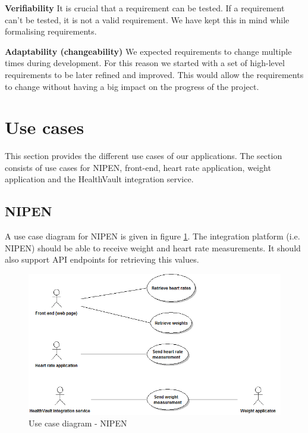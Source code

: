 \textbf{Verifiability}\newline
It is crucial that a requirement can be tested. If a requirement can't be tested, it is not a valid requirement.
We have kept this in mind while formalising requirements.

\textbf{Adaptability (changeability)}\newline
We expected requirements to change multiple times during development.
For this reason we started with a set of high-level requirements to be later refined and improved.
This would allow the requirements to change without having a big impact on the progress of the project.


\newpage
\section{Use cases}
\label{section:usecases}

This section provides  the different use cases of our applications.
The section consists of use cases for NIPEN, front-end, heart rate application, weight application and the HealthVault integration service.

\subsection{NIPEN}

A use case diagram for NIPEN is given in figure \ref{figure:use-case-diagram-nipen}.
The integration platform (i.e. NIPEN) should be able to receive weight and heart rate measurements.
It should also support API endpoints for retrieving this values.

\begin{figure}[H]
\centering
\includegraphics[scale=0.6]{../Figures/use-case-diagram-nipen.png}
\caption{Use case diagram - NIPEN}
\label{figure:use-case-diagram-nipen}
\end{figure}

